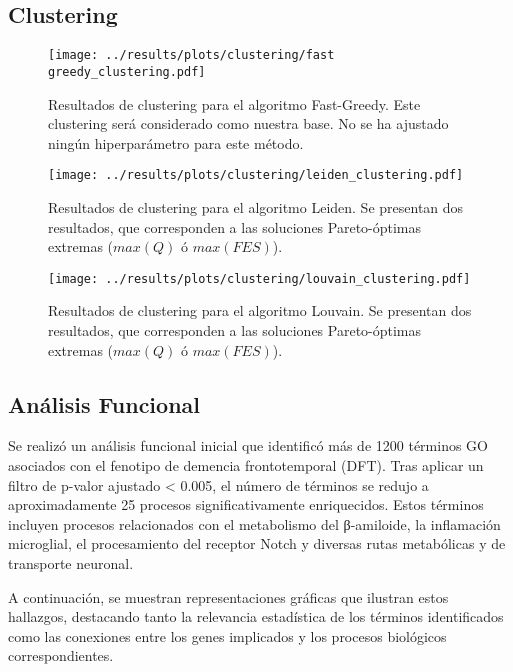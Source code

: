 \subsection{Clustering}

\begin{figure}[htbp]
	\centering
	\texttt{[image: ../results/plots/clustering/fast greedy\_clustering.pdf]}
	\caption{Resultados de clustering para el algoritmo Fast-Greedy. Este clustering será considerado como nuestra base. No se ha ajustado ningún hiperparámetro para este método.}
	\label{fig:fastgreedy_clustering}
\end{figure}

\begin{figure}[htbp]
	\centering
	\texttt{[image: ../results/plots/clustering/leiden\_clustering.pdf]}
	\caption{Resultados de clustering para el algoritmo Leiden. Se presentan dos resultados, que corresponden a las soluciones Pareto-óptimas extremas (\(max(Q)\) ó \(max(FES)\)).}
	\label{fig:leiden_clustering}
\end{figure}

\begin{figure}[htbp]
	\centering
	\texttt{[image: ../results/plots/clustering/louvain\_clustering.pdf]}
	\caption{Resultados de clustering para el algoritmo Louvain. Se presentan dos resultados, que corresponden a las soluciones Pareto-óptimas extremas (\(max(Q)\) ó \(max(FES)\)).}
	\label{fig:louvain_clustering}
\end{figure}

\subsection{Análisis Funcional}

Se realizó un análisis funcional inicial que identificó más de 1200 términos GO asociados con el fenotipo de demencia frontotemporal (DFT). Tras aplicar un filtro de p-valor ajustado < 0.005, el número de términos se redujo a aproximadamente 25 procesos significativamente enriquecidos. Estos términos incluyen procesos relacionados con el metabolismo del β-amiloide, la inflamación microglial, el procesamiento del receptor Notch y diversas rutas metabólicas y de transporte neuronal.

A continuación, se muestran representaciones gráficas que ilustran estos hallazgos, destacando tanto la relevancia estadística de los términos identificados como las conexiones entre los genes implicados y los procesos biológicos correspondientes.


